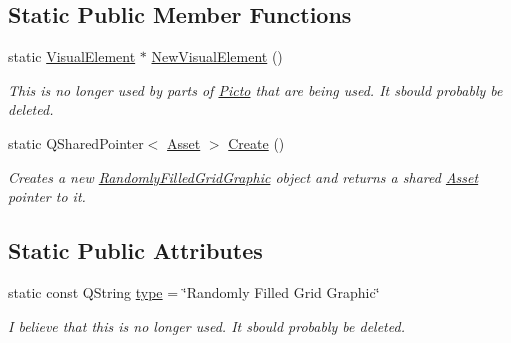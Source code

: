 \subsection*{Static Public Member Functions}
\begin{DoxyCompactItemize}
\item 
\hypertarget{class_picto_1_1_randomly_filled_grid_graphic_a098f91c918916a5f7d052ae4b02ef86c}{static \hyperlink{struct_picto_1_1_visual_element}{Visual\-Element} $\ast$ \hyperlink{class_picto_1_1_randomly_filled_grid_graphic_a098f91c918916a5f7d052ae4b02ef86c}{New\-Visual\-Element} ()}\label{class_picto_1_1_randomly_filled_grid_graphic_a098f91c918916a5f7d052ae4b02ef86c}

\begin{DoxyCompactList}\small\item\em This is no longer used by parts of \hyperlink{namespace_picto}{Picto} that are being used. It sbould probably be deleted. \end{DoxyCompactList}\item 
\hypertarget{class_picto_1_1_randomly_filled_grid_graphic_a1c1441973a462a2abf3f96ac29e70e02}{static Q\-Shared\-Pointer$<$ \hyperlink{class_picto_1_1_asset}{Asset} $>$ \hyperlink{class_picto_1_1_randomly_filled_grid_graphic_a1c1441973a462a2abf3f96ac29e70e02}{Create} ()}\label{class_picto_1_1_randomly_filled_grid_graphic_a1c1441973a462a2abf3f96ac29e70e02}

\begin{DoxyCompactList}\small\item\em Creates a new \hyperlink{class_picto_1_1_randomly_filled_grid_graphic}{Randomly\-Filled\-Grid\-Graphic} object and returns a shared \hyperlink{class_picto_1_1_asset}{Asset} pointer to it. \end{DoxyCompactList}\end{DoxyCompactItemize}
\subsection*{Static Public Attributes}
\begin{DoxyCompactItemize}
\item 
\hypertarget{class_picto_1_1_randomly_filled_grid_graphic_a7d512e1c379a5da7ca1ac2c3bda6e8c5}{static const Q\-String \hyperlink{class_picto_1_1_randomly_filled_grid_graphic_a7d512e1c379a5da7ca1ac2c3bda6e8c5}{type} = \char`\"{}Randomly Filled Grid Graphic\char`\"{}}\label{class_picto_1_1_randomly_filled_grid_graphic_a7d512e1c379a5da7ca1ac2c3bda6e8c5}

\begin{DoxyCompactList}\small\item\em I believe that this is no longer used. It sbould probably be deleted. \end{DoxyCompactList}\end{DoxyCompactItemize}
